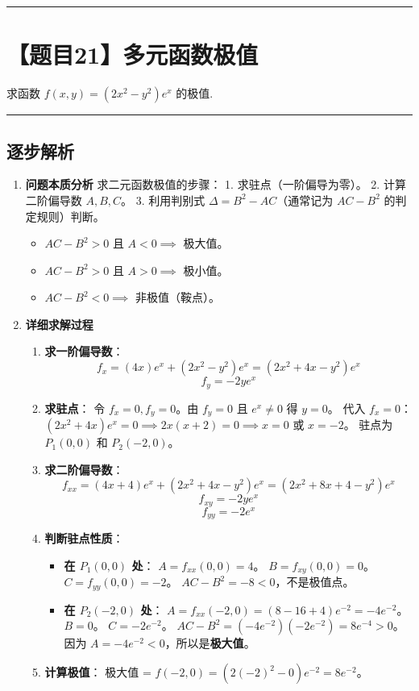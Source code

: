 \documentclass[UTF8,10pt]{ctexart}
\newenvironment{redenv}{\color{red}}{}
\newenvironment{detailedanalysis}{%
    \color{red}
    \begin{enumerate}[label=\textbf{第\arabic*步：}, leftmargin=*, align=left, itemsep=0pt, parsep=0pt, topsep=0pt, partopsep=0pt]
}{%
    \end{enumerate}
}
\newcommand{\problemrule}{\par\filbreak\noindent\rule{\textwidth}{1.5pt}\vspace{-0.5em}}
\newcommand{\analysisrule}{\noindent\rule{\textwidth}{0.8pt}\vspace{-0.5em}}
\begin{document}
\problemrule
\section*{【题目21】多元函数极值}
求函数 $f(x,y) = (2x^2 - y^2)e^x$ 的极值.

\begin{redenv}
\analysisrule
\subsection*{逐步解析}

\begin{detailedanalysis}
\item \textbf{问题本质分析}
求二元函数极值的步骤：
1. 求驻点（一阶偏导为零）。
2. 计算二阶偏导数 $A, B, C$。
3. 利用判别式 $\Delta = B^2 - AC$（通常记为 $AC-B^2$ 的判定规则）判断。
\begin{itemize}
    \item $AC - B^2 > 0$ 且 $A < 0 \implies$ 极大值。
    \item $AC - B^2 > 0$ 且 $A > 0 \implies$ 极小值。
    \item $AC - B^2 < 0 \implies$ 非极值（鞍点）。
\end{itemize}

\item \textbf{详细求解过程}
\begin{enumerate}[label=(\alph*)]
    \item \textbf{求一阶偏导数}：
    \[ f_x = (4x)e^x + (2x^2-y^2)e^x = (2x^2+4x-y^2)e^x \]
    \[ f_y = -2y e^x \]
    \item \textbf{求驻点}：
    令 $f_x=0, f_y=0$。由 $f_y=0$ 且 $e^x \neq 0$ 得 $y=0$。
    代入 $f_x=0$：$(2x^2+4x)e^x = 0 \implies 2x(x+2)=0 \implies x=0$ 或 $x=-2$。
    驻点为 $P_1(0,0)$ 和 $P_2(-2,0)$。
    \item \textbf{求二阶偏导数}：
    \[ f_{xx} = (4x+4)e^x + (2x^2+4x-y^2)e^x = (2x^2+8x+4-y^2)e^x \]
    \[ f_{xy} = -2y e^x \]
    \[ f_{yy} = -2e^x \]
    \item \textbf{判断驻点性质}：
    \begin{itemize}
        \item \textbf{在 $P_1(0,0)$ 处}：
        $A = f_{xx}(0,0) = 4$。
        $B = f_{xy}(0,0) = 0$。
        $C = f_{yy}(0,0) = -2$。
        $AC - B^2 = -8 < 0$，不是极值点。
        
        \item \textbf{在 $P_2(-2,0)$ 处}：
        $A = f_{xx}(-2,0) = (8-16+4)e^{-2} = -4e^{-2}$。
        $B = 0$。
        $C = -2e^{-2}$。
        $AC - B^2 = (-4e^{-2})(-2e^{-2}) = 8e^{-4} > 0$。
        因为 $A = -4e^{-2} < 0$，所以是\textbf{极大值}。
    \end{itemize}
    \item \textbf{计算极值}：
    极大值 = $f(-2,0) = (2(-2)^2 - 0)e^{-2} = 8e^{-2}$。
\end{enumerate}


\end{detailedanalysis}
\end{redenv}
\end{document}
